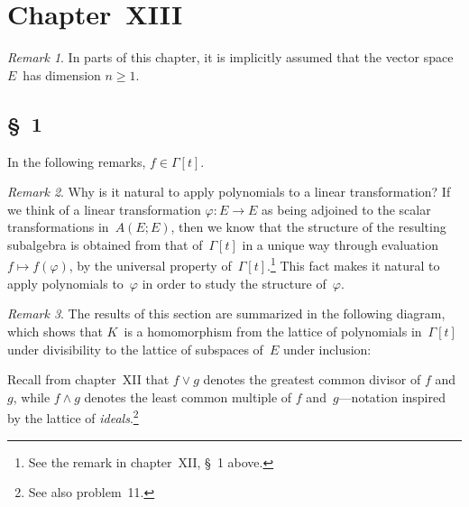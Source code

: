 \documentclass[letterpaper,12pt]{article}
\newcommand{\sect}{\cap}
\newcommand{\join}{\vee}
\newcommand{\meet}{\wedge}
\theoremstyle{definition}
\theoremstyle{remark}
\newtheorem*{rmk}{Remark}
\begin{document}
\newpage
\section*{Chapter~XIII}
\begin{rmk}
In parts of this chapter, it is implicitly assumed that the vector space \(E\)~has dimension \(n\ge 1\).
\end{rmk}

\subsection*{\S~1}
In the following remarks, \(f\in\Gamma[t]\).
\begin{rmk}
Why is it natural to apply polynomials to a linear transformation? If we think of a linear transformation \(\varphi:E\to E\) as being adjoined to the scalar transformations in~\(A(E;E)\), then we know that the structure of the resulting subalgebra is obtained from that of~\(\Gamma[t]\) in a unique way through evaluation \(f\mapsto f(\varphi)\), by the universal property of~\(\Gamma[t]\).\footnote{See the remark in chapter~XII, \S~1 above.} This fact makes it natural to apply polynomials to~\(\varphi\) in order to study the structure of~\(\varphi\).
\end{rmk}

\begin{rmk}
The results of this section are summarized in the following diagram, which shows that \(K\)~is a homomorphism from the lattice of polynomials in~\(\Gamma[t]\) under divisibility to the lattice of subspaces of~\(E\) under inclusion:
\begin{center}
\end{center}
Recall from chapter~XII that \(f\join g\) denotes the greatest common divisor of \(f\) and~\(g\), while \(f\meet g\) denotes the least common multiple of \(f\) and~\(g\)---notation inspired by the lattice of \emph{ideals}.\footnote{See also problem~11.}
\end{rmk}
\end{document}
